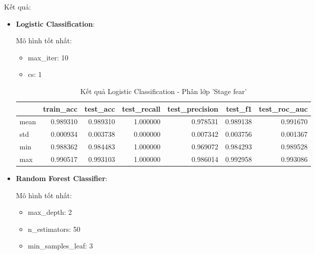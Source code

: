     Kết quả:
    \begin{itemize}
        \item \textbf{Logistic Classification}: 
        
            Mô hình tốt nhất:
            \begin{itemize}
                \item max\_iter: 10
                \item cs: 1
            \end{itemize}

            \begin{table}[htbp]
            \centering
            \caption{Kết quả Logistic Classification - Phân lớp 'Stage fear'}
            \label{tab:Behavior-stage-LogCV}
            \begin{tabular}{lrrrrrr}
                \hline
                & train\_acc & test\_acc & test\_recall & test\_precision & test\_f1 & test\_roc\_auc \\
                \hline
                mean & 0.989310 & 0.989310 & 1.000000 & 0.978531 & 0.989138 & 0.991670 \\
                std & 0.000934 & 0.003738 & 0.000000 & 0.007342 & 0.003756 & 0.001367 \\
                min & 0.988362 & 0.984483 & 1.000000 & 0.969072 & 0.984293 & 0.989528 \\
                max & 0.990517 & 0.993103 & 1.000000 & 0.986014 & 0.992958 & 0.993086 \\
                \hline
            \end{tabular}
            \end{table}
  
            
            \FloatBarrier
            
        \item \textbf{Random Forest Classifier}:

            Mô hình tốt nhất:
            \begin{itemize}
                \item max\_depth: 2
                \item n\_estimators: 50
                \item min\_samples\_leaf: 3
            \end{itemize}


\end{itemize}

